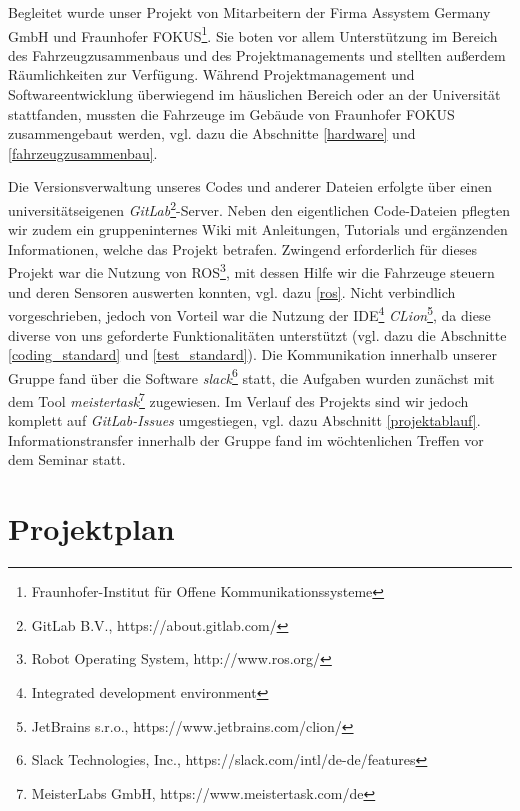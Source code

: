 \documentclass[a4paper, 12pt, titlepage]{scrartcl}
\begin{document}
		Begleitet wurde unser Projekt von Mitarbeitern der Firma Assystem Germany GmbH und Fraunhofer FOKUS\footnote{Fraunhofer-Institut für Offene Kommunikationssysteme}. 
		Sie boten vor allem Unterstützung im Bereich des Fahrzeugzusammenbaus und des Projektmanagements und stellten außerdem 
		Räumlichkeiten zur Verfügung. Während Projektmanagement und Softwareentwicklung überwiegend im häuslichen Bereich oder an der 
		Universität stattfanden, mussten die Fahrzeuge im Gebäude von Fraunhofer FOKUS zusammengebaut werden, vgl. dazu die Abschnitte \ref{hardware} und \ref{fahrzeugzusammenbau}. 
		
		Die Versionsverwaltung unseres Codes und anderer Dateien erfolgte über einen universitätseigenen \emph{GitLab}\footnote{GitLab B.V., https://about.gitlab.com/}-Server. Neben den eigentlichen Code-Dateien pflegten wir zudem ein gruppeninternes 
		Wiki mit Anleitungen, Tutorials und ergänzenden Informationen, welche das Projekt betrafen. 
		Zwingend erforderlich für dieses Projekt war die Nutzung von ROS\footnote{Robot Operating System, http://www.ros.org/}, 
		mit dessen Hilfe wir die Fahrzeuge steuern und deren Sensoren auswerten konnten, vgl. dazu \ref{ros}. 
		Nicht verbindlich vorgeschrieben, jedoch von Vorteil war die Nutzung der IDE\footnote{Integrated development environment} 
		\emph{CLion}\footnote{JetBrains s.r.o., https://www.jetbrains.com/clion/}, da diese diverse von uns geforderte Funktionalitäten unterstützt (vgl. dazu die Abschnitte \ref{coding_standard} und \ref{test_standard}).
		Die Kommunikation innerhalb unserer Gruppe fand über die Software \emph{slack}\footnote{Slack Technologies, Inc., https://slack.com/intl/de-de/features} statt, die Aufgaben wurden zunächst mit dem Tool \emph{meistertask}\footnote{MeisterLabs GmbH, https://www.meistertask.com/de} zugewiesen. Im Verlauf des Projekts sind wir jedoch komplett auf \emph{GitLab-Issues} umgestiegen, vgl. dazu Abschnitt \ref{projektablauf}. Informationstransfer innerhalb der Gruppe fand im wöchtenlichen Treffen vor dem Seminar statt. 
	
	\section{Projektplan}
	\label{projektplan} 
\end{document}
